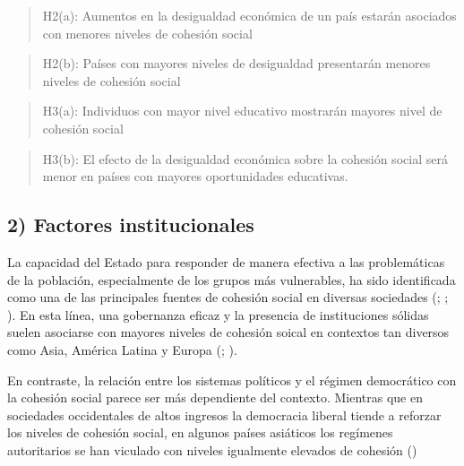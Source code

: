 \documentclass[
  spanish,
  letterpaper,
  DIV=11,
  numbers=noendperiod]{scrartcl}
\begin{document}
\begin{quote}
H2(a): Aumentos en la desigualdad económica de un país estarán asociados
con menores niveles de cohesión social
\end{quote}

\begin{quote}
H2(b): Países con mayores niveles de desigualdad presentarán menores
niveles de cohesión social
\end{quote}

\begin{quote}
H3(a): Individuos con mayor nivel educativo mostrarán mayores nivel de
cohesión social
\end{quote}

\begin{quote}
H3(b): El efecto de la desigualdad económica sobre la cohesión social
será menor en países con mayores oportunidades educativas.
\end{quote}

\subsection{2) Factores institucionales}\label{factores-institucionales}

La capacidad del Estado para responder de manera efectiva a las
problemáticas de la población, especialmente de los grupos más
vulnerables, ha sido identificada como una de las principales fuentes de
cohesión social en diversas sociedades
(;
;
). En esta
línea, una gobernanza eficaz y la presencia de instituciones sólidas
suelen asociarse con mayores niveles de cohesión soical en contextos tan
diversos como Asia, América Latina y Europa
(;
).

En contraste, la relación entre los sistemas políticos y el régimen
democrático con la cohesión social parece ser más dependiente del
contexto. Mientras que en sociedades occidentales de altos ingresos la
democracia liberal tiende a reforzar los niveles de cohesión social, en
algunos países asiáticos los regímenes autoritarios se han viculado con
niveles igualmente elevados de cohesión
()
\end{document}
